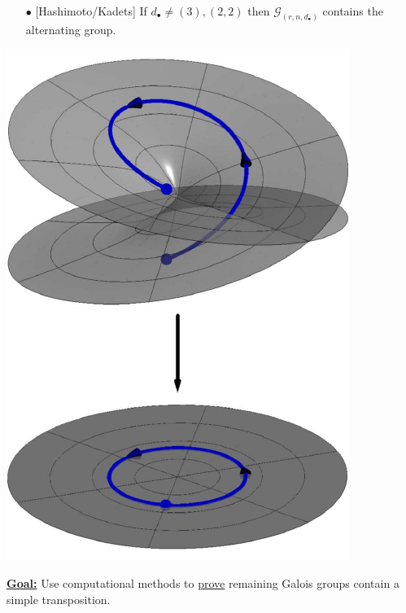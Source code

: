 \documentclass{beamer}
\theoremstyle{definition}
\begin{document}
\begin{frame}
\begin{minipage}{.71\textwidth}
\begin{enumerate}
\item[$\bullet$] [Hashimoto/Kadets] If $d_\bullet\ne(3),(2,2)$ then $\mathcal{G}_{(r,n,d_\bullet)}$ contains the alternating group.
\end{enumerate}
\end{minipage}
%
\begin{minipage}{.25\textwidth}
\begin{center}
\includegraphics[scale=.48]{figures/monodromy.pdf}
\end{center}
\end{minipage}

\vspace{.4cm}

\textbf{\underline{Goal:}} Use computational methods to \underline{prove} remaining Galois groups contain a simple transposition.

\end{frame}


\end{document}
